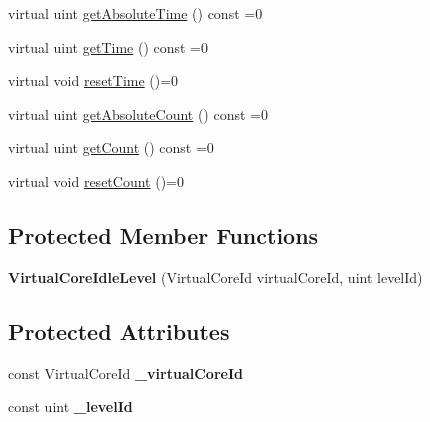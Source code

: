 \begin{DoxyCompactItemize}
virtual uint \hyperlink{classmammut_1_1topology_1_1VirtualCoreIdleLevel_ae841eaa71ad7accb31c37f06f6479030}{get\-Absolute\-Time} () const =0
\item 
virtual uint \hyperlink{classmammut_1_1topology_1_1VirtualCoreIdleLevel_a44854d4cd60b782ae2738fff8e86ca6e}{get\-Time} () const =0
\item 
virtual void \hyperlink{classmammut_1_1topology_1_1VirtualCoreIdleLevel_a22fff5c84d8b377fa1845cafd0df0112}{reset\-Time} ()=0
\item 
virtual uint \hyperlink{classmammut_1_1topology_1_1VirtualCoreIdleLevel_a77b2e87e91dedf6dfa593324875c94fa}{get\-Absolute\-Count} () const =0
\item 
virtual uint \hyperlink{classmammut_1_1topology_1_1VirtualCoreIdleLevel_a031d27afe2c4a164f35fc2c2eeaa22ca}{get\-Count} () const =0
\item 
virtual void \hyperlink{classmammut_1_1topology_1_1VirtualCoreIdleLevel_adf46930dfd0fc152490405f586394fd3}{reset\-Count} ()=0
\end{DoxyCompactItemize}
\subsection*{Protected Member Functions}
\begin{DoxyCompactItemize}
\item 
\hypertarget{classmammut_1_1topology_1_1VirtualCoreIdleLevel_aaa9ecf7f95a81177ab03db5362b5af02}{{\bfseries Virtual\-Core\-Idle\-Level} (Virtual\-Core\-Id virtual\-Core\-Id, uint level\-Id)}\label{classmammut_1_1topology_1_1VirtualCoreIdleLevel_aaa9ecf7f95a81177ab03db5362b5af02}

\end{DoxyCompactItemize}
\subsection*{Protected Attributes}
\begin{DoxyCompactItemize}
\item 
\hypertarget{classmammut_1_1topology_1_1VirtualCoreIdleLevel_a04232f0908e795991f658e6ef271315f}{const Virtual\-Core\-Id {\bfseries \-\_\-virtual\-Core\-Id}}\label{classmammut_1_1topology_1_1VirtualCoreIdleLevel_a04232f0908e795991f658e6ef271315f}

\item 
\hypertarget{classmammut_1_1topology_1_1VirtualCoreIdleLevel_a23b0cb5c7f06c62d5b7f98e52186aac1}{const uint {\bfseries \-\_\-level\-Id}}\label{classmammut_1_1topology_1_1VirtualCoreIdleLevel_a23b0cb5c7f06c62d5b7f98e52186aac1}

\end{DoxyCompactItemize}


